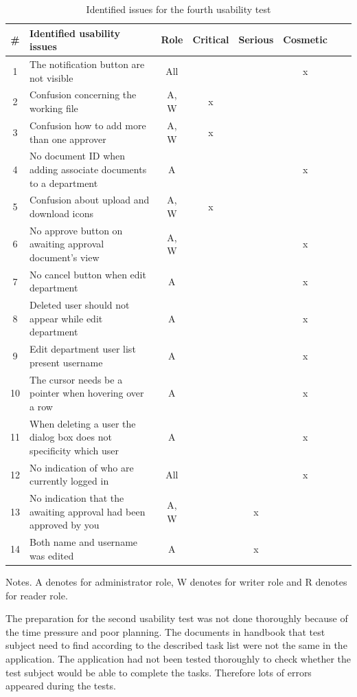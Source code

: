 \begin{table}[H]
	\begin{center}
	\begin{tabular}{| c | m{15em} | c | c | c | c | c | c |}
		\hline
		\# & \textbf{Identified usability issues} & Role & Critical & Serious & Cosmetic \\
		\hline
		 1 & The notification button are not visible & All & & & x \\
		\hline
		 2 & Confusion concerning the working file & A, W & x & & \\
		\hline
		 3 & Confusion how to add more than one approver & A, W & x & & \\
		\hline
		4 & No document ID when adding associate documents to a department & A & & & x\\
		\hline
		5 &  Confusion about upload and download icons & A, W & x &  &\\
		\hline
		6 & No approve button on awaiting approval document's view & A, W &  & & x\\
		\hline
		7 & No cancel button when edit department & A & & & x\\
		\hline
		8 & Deleted user should not appear while edit department & A & & & x \\
		\hline
		9 & Edit department user list present username & A &  & & x \\
		\hline
		10 & The cursor needs be a pointer when hovering over a row & A &  &  & x \\
		\hline
		11 & When deleting a user the dialog box  does not specificity which user & A & & & x\\
		\hline
		12 & No indication of who are currently logged in & All & & & x \\
		\hline
		13 & No indication that the awaiting approval had been approved by you & A, W & & x & \\
		\hline
		14 & Both name and username was edited & A & & x & \\
		\hline
	\end{tabular}
	\end{center}
	 {\raggedright Notes. A denotes for administrator role, W denotes for writer role and R denotes for reader role.\par}
	\caption{Identified issues for the fourth usability test}\label{tab:utest4}
\end{table}

The preparation for the second usability test was not done thoroughly because of the time pressure and poor planning.
The documents in handbook that test subject need to find according to the  described task list were not the same in the application.
The application had not been tested thoroughly to check whether the test subject would be able to complete the tasks.
Therefore lots of errors appeared during the tests.

